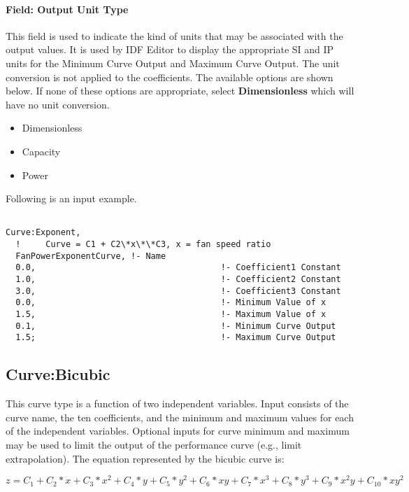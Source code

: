 \paragraph{Field: Output Unit Type}\label{field-output-unit-type-4}

This field is used to indicate the kind of units that may be associated with the output values. It is used by IDF Editor to display the appropriate SI and IP units for the Minimum Curve Output and Maximum Curve Output. The unit conversion is not applied to the coefficients. The available options are shown below. If none of these options are appropriate, select \textbf{Dimensionless} which will have no unit conversion.

\begin{itemize}
\item
  Dimensionless
\item
  Capacity
\item
  Power
\end{itemize}

Following is an input example.

\begin{lstlisting}

Curve:Exponent,
  !     Curve = C1 + C2\*x\*\*C3, x = fan speed ratio
  FanPowerExponentCurve, !- Name
  0.0,                                     !- Coefficient1 Constant
  1.0,                                     !- Coefficient2 Constant
  3.0,                                     !- Coefficient3 Constant
  0.0,                                     !- Minimum Value of x
  1.5,                                     !- Maximum Value of x
  0.1,                                     !- Minimum Curve Output
  1.5;                                     !- Maximum Curve Output
\end{lstlisting}

\subsection{Curve:Bicubic}\label{curvebicubic}

This curve type is a function of two independent variables. Input consists of the curve name, the ten coefficients, and the minimum and maximum values for each of the independent variables. Optional inputs for curve minimum and maximum may be used to limit the output of the performance curve (e.g., limit extrapolation). The equation represented by the bicubic curve is:

\begin{equation}
z = {C_1} + {C_2}*x + {C_3}*{x^2} + {C_4}*y + {C_5}*{y^2} + {C_6}*xy + {C_7}*{x^3} + {C_8}*{y^3} + {C_9}*{x^2}y + {C_{10}}*x{y^2}
\end{equation}

